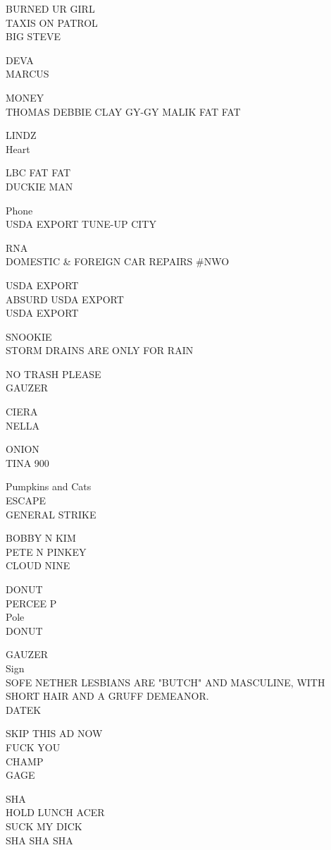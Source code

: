 \documentclass[10pt,letterpaper]{article}
\begin{document}
BURNED UR GIRL\\
TAXIS ON PATROL\\
BIG STEVE

DEVA\\
MARCUS

MONEY\\
THOMAS DEBBIE CLAY GY{-}GY MALIK FAT FAT

LINDZ\\
Heart

LBC FAT FAT\\
DUCKIE MAN

Phone\\
USDA EXPORT TUNE{-}UP CITY

RNA\\
DOMESTIC \& FOREIGN CAR REPAIRS \#NWO

USDA EXPORT\\
ABSURD USDA EXPORT\\
USDA EXPORT

SNOOKIE\\
STORM DRAINS ARE ONLY FOR RAIN

NO TRASH PLEASE\\
GAUZER

CIERA\\
NELLA

ONION\\
TINA 900

Pumpkins and Cats\\
ESCAPE\\
GENERAL STRIKE

BOBBY N KIM\\
PETE N PINKEY\\
CLOUD NINE

DONUT\\
PERCEE P\\
Pole\\
DONUT

GAUZER\\
Sign\\
SOFE NETHER LESBIANS ARE "BUTCH" AND MASCULINE, WITH SHORT HAIR AND A GRUFF DEMEANOR.\\
DATEK

SKIP THIS AD NOW\\
FUCK YOU\\
CHAMP\\
GAGE

SHA\\
HOLD LUNCH ACER\\
SUCK MY DICK\\
SHA SHA SHA
\end{document}
